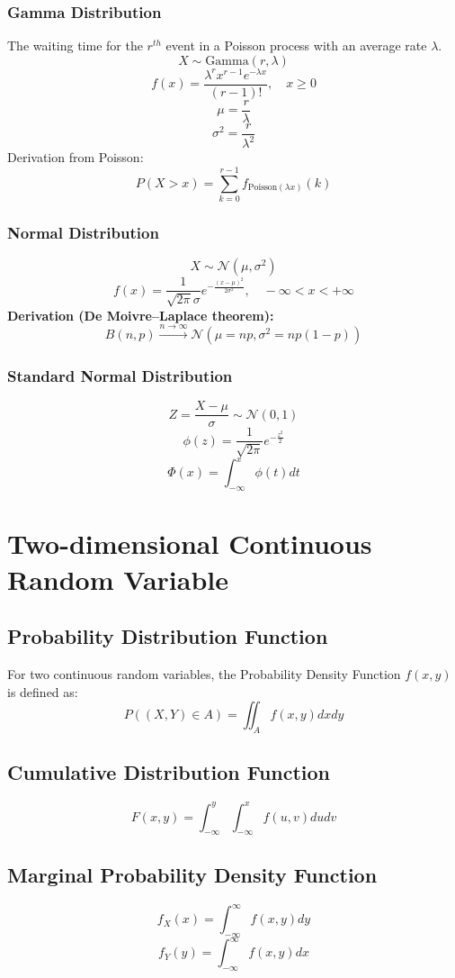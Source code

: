 \documentclass{article}
\begin{document}
\subsubsection{Gamma Distribution}
The waiting time for the \( r^{th} \) event in a Poisson process with an average rate \( \lambda \).
\[ X \sim \mathrm{Gamma}(r, \lambda) \]
\[
    f(x) = \frac{\lambda^r x^{r-1} e^{-\lambda x}}{(r-1)!}, \quad x \geq 0
\]
\[
    \mu = \frac{r}{\lambda}
\]
\[
    \sigma^2 = \frac{r}{\lambda^2}
\]
Derivation from Poisson:
\[
    P(X > x) = \sum_{k=0}^{r-1} f_{\text{Poisson}(\lambda x)}(k)
\]

\subsubsection{Normal Distribution}
\[ X \sim \mathcal{N}(\mu, \sigma^2) \]
\[ f(x) = \frac{1}{\sqrt{2\pi}\sigma} e^{-\frac{(x-\mu)^2}{2\sigma^2}}, \quad -\infty < x < +\infty \]
\textbf{Derivation (De Moivre–Laplace theorem):}
\[
    B(n, p) \xrightarrow{n \to \infty} \mathcal{N}(\mu = np, \sigma^2 = np(1-p))
\]


\subsubsection{Standard Normal Distribution}
\[ Z = \frac{X-\mu}{\sigma} \sim \mathcal{N}(0,1) \]
\[ \phi(z) = \frac{1}{\sqrt{2\pi}} e^{-\frac{z^2}{2}} \]
\[ \Phi(x) = \int_{-\infty}^{x} \phi(t)dt \]

\newpage
\section{Two-dimensional Continuous Random Variable}

\subsection{Probability Distribution Function}
For two continuous random variables, the Probability Density Function \( f(x,y) \) is defined as:
\[
    P((X,Y) \in A) = \iint_{A} f(x,y) dx dy
\]

\subsection{Cumulative Distribution Function}
\[
    F(x,y) = \int_{-\infty}^{y} \int_{-\infty}^{x} f(u,v) du dv
\]

\subsection{Marginal Probability Density Function}
\[
    f_X(x) = \int_{-\infty}^{\infty} f(x,y)dy
\]
\[
    f_Y(y) = \int_{-\infty}^{\infty} f(x,y)dx
\]
\end{document}
